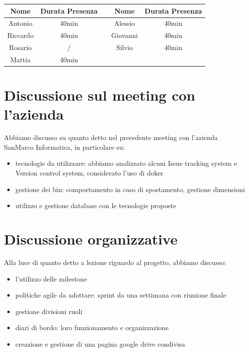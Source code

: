 \documentclass[12pt,a4paper]{article}
\begin{document}
\begin{center}
    \begin{tabular}{ |c|c|c|c|c| }
        \hline
        Nome     & Durata Presenza &  & Nome     & Durata Presenza \\
        \hline
        Antonio  & 40min          &  & Alessio  & 40min           \\
        \hline
        Riccardo & 40min           &  & Giovanni & 40min           \\
        \hline
        Rosario  & /           &  & Silvio   & 40min           \\
        \hline
        Mattia   & 40min           &  &          &                 \\
        \hline

    \end{tabular}
\end{center}

\newpage



\section{Discussione sul meeting con l'azienda}
Abbiamo discusso su quanto detto nel precedente meeting con l'azienda SanMarco Informatica, in particolare su: 
\begin{itemize}
    \item tecnologie da utilizzare: abbiamo analizzato alcuni Issue tracking system e Version control system, considerato l'uso di doker
    \item gestione dei bin: comportamento in caso di spostamento, gestione dimensioni
    \item utilizzo e gestione database con le tecnologie proposte
\end{itemize} 
\section{Discussione organizzative}
 Alla luce di quanto detto a lezione riguardo al progetto, abbiamo discusso:
 \begin{itemize}
    \item l'utilizzo delle milestone 
    \item politiche agile da adottare: sprint da una settimana con riunione finale
    \item gestione divisioni ruoli
    \item diari di bordo: loro funzionamento e organizzazione
    \item creazione e gestione di una pagina google drive condivisa
\end{itemize} 
\end{document}
